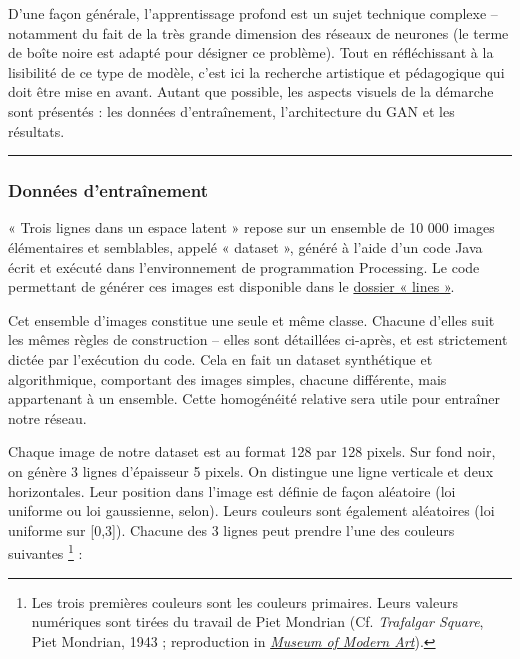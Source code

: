 \documentclass[
]{article}
\begin{document}
D'une façon générale, l'apprentissage profond est un sujet technique complexe -- notamment du fait de la très grande dimension des réseaux de neurones (le terme de boîte noire est adapté pour désigner ce problème). Tout en réfléchissant à la lisibilité de ce type de modèle, c'est ici la recherche artistique et pédagogique qui doit être mise en avant. Autant que possible, les aspects visuels de la démarche sont présentés : les données d'entraînement, l'architecture du GAN et les résultats.

\begin{center}\rule{0.5\linewidth}{0.5pt}\end{center}

\hypertarget{donnuxe9es-dentrauxeenement}{%
\subsubsection{Données d'entraînement}\label{donnuxe9es-dentrauxeenement}}

« Trois lignes dans un espace latent » repose sur un ensemble de 10 000 images élémentaires et semblables, appelé « dataset », généré à l'aide d'un code Java écrit et exécuté dans l'environnement de programmation Processing. Le code permettant de générer ces images est disponible dans le \href{https://github.com/kaugrv/models_words/blob/main/lines/lines.pde}{dossier « lines »}.

Cet ensemble d'images constitue une seule et même classe. Chacune d'elles suit les mêmes règles de construction -- elles sont détaillées ci-après, et est strictement dictée par l'exécution du code. Cela en fait un dataset synthétique et algorithmique, comportant des images simples, chacune différente, mais appartenant à un ensemble. Cette homogénéité relative sera utile pour entraîner notre réseau.

Chaque image de notre dataset est au format 128 par 128 pixels. Sur fond noir, on génère 3 lignes d'épaisseur 5 pixels. On distingue une ligne verticale et deux horizontales. Leur position dans l'image est définie de façon aléatoire (loi uniforme ou loi gaussienne, selon). Leurs couleurs sont également aléatoires (loi uniforme sur {[}0,3{]}). Chacune des 3 lignes peut prendre l'une des couleurs suivantes \footnote{Les trois premières couleurs sont les couleurs primaires. Leurs valeurs numériques sont tirées du travail de Piet Mondrian (Cf. \emph{Trafalgar Square}, Piet Mondrian, 1943 ; reproduction in \emph{\href{https://www.moma.org/collection/works/79879}{Museum of Modern Art}}).} :
\end{document}
